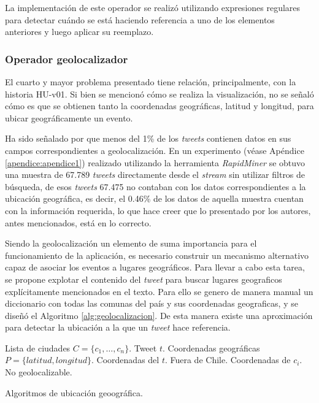 La implementación de este operador se realizó utilizando expresiones regulares para detectar cuándo se está haciendo referencia a uno de los elementos anteriores y luego aplicar su reemplazo.

\subsubsection*{Operador geolocalizador}
\label{subsubsec:4op}

El cuarto y mayor problema presentado tiene relación, principalmente, con la historia HU-v01. Si bien se mencionó cómo se realiza la visualización, no se señaló cómo es que se obtienen tanto la coordenadas geográficas, latitud y longitud, para ubicar geográficamente un evento.

Ha sido señalado por \cite{ChatoSurvey} que menos del 1\% de los \textit{tweets} contienen datos en sus campos correspondientes a geolocalización. En un experimento (véase Apéndice \ref{apendice:apendice1}) realizado utilizando la herramienta \textit{RapidMiner} se obtuvo una muestra de 67.789 \textit{tweets} directamente desde el \textit{stream} sin utilizar filtros de búsqueda, de esos \textit{tweets} 67.475 no contaban con los datos correspondientes a la ubicación geográfica, es decir, el 0.46\% de los datos de aquella muestra cuentan con la información requerida, lo que hace creer que lo presentado por los autores, antes mencionados, está en lo correcto.

Siendo la geolocalización un elemento de suma importancia para el funcionamiento de la aplicación, es necesario construir un mecanismo alternativo capaz de asociar los eventos a lugares geográficos. Para llevar a cabo esta tarea, se propone explotar el contenido del \textit{tweet} para buscar lugares geograficos explícitamente mencionados en el texto. Para ello se genero de manera manual un diccionario con todas las comunas del país y sus coordenadas geograficas, \cite{ubicacionesChile} y se diseñó el Algoritmo \ref{alg:geolocalizacion}. De esta manera existe una aproximación para detectar la ubicación a la que un \textit{tweet} hace referencia.\\

\begin{algorithm}[H]
	\begin{algorithmic}
		\REQUIRE Lista de ciudades $C=\{c_{1}, \dots, c_{n} \}$.
		\REQUIRE Tweet $t$.
		\ENSURE Coordenadas geográficas $P=\{latitud, longitud\}$.
				\RETURN Coordenadas del $t$.
			\ELSE
				\RETURN Fuera de Chile.
			\ENDIF
		\ELSE
				\RETURN Coordenadas de $c_{i}$.
			\ELSE
				\RETURN No geolocalizable.
			\ENDIF
		\ENDIF
	\end{algorithmic}
	\caption{Algoritmos de ubicación geoográfica.}
	\label{alg:geolocalizacion}
\end{algorithm}\vphantom\\


